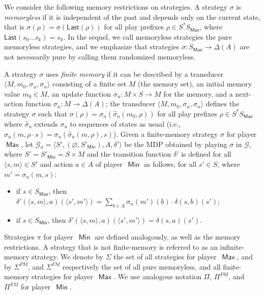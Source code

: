 \documentclass{article}
\newcommand{\tuple}[1]{\langle #1 \rangle}
\let\emptyset\varnothing
\newcommand{\Last}{\mathsf{Last}}
\newcommand{\DD}{\Delta}
\newcommand{\GG}{\mathcal{G}}
\newcommand{\PP}{\delta}
\newcommand{\straa}{\sigma}
\newcommand{\Straa}{\Sigma}
\newcommand{\strab}{\pi}
\newcommand{\Strab}{\Pi}
\DeclareMathOperator{\ma}{\mathsf{Max}}
\DeclareMathOperator{\mi}{\mathsf{Min}}
\begin{document}
We consider the following memory restrictions on strategies.
A strategy $\straa$ is \emph{memoryless} if it is independent of the past and depends only on 
the current state, that is $\straa(\rho) = \straa(\Last(\rho))$ for all play prefixes 
$\rho \in S^*S_{\ma}$, where $\Last(s_0 \dots s_k) = s_k$.
In the sequel, we call memoryless strategies the pure memoryless strategies,
and we emphasize that strategies $\straa: S_{\ma} \to \DD(A)$ are not necessarily 
pure by calling them randomized memoryless.


A strategy $\straa$ uses \emph{finite memory} if it can be described 
by a transducer $\tuple{M, m_0, \straa_u, \straa_n}$ consisting of a finite
set $M$ (the memory set), an initial memory value $m_0 \in M$, 
an update function $\straa_u: M \times S \to M$ for the memory, 
and a next-action function $\straa_n: M \to \DD(A)$; the transducer $\tuple{M, m_0, \straa_u, \straa_n}$ 
defines the strategy $\straa$ such that $\straa(\rho) = \straa_n(\hat{\straa}_u(m_0,\rho))$ 
for all play prefixes $\rho \in S^*S_{\ma}$
where $\hat{\straa}_u$ extends $\straa_u$ to sequences of states as usual (i.e.,
$\hat{\straa}_u(m, \rho \cdot s) = \straa_u(\hat{\straa}_u(m, \rho), s)$).
Given a finite-memory strategy $\straa$ for player~$\ma$, let $\GG_\straa = \tuple{S', (\emptyset, S'_{\mi}), A, \PP'}$ 
be the MDP obtained by playing $\straa$ in $\GG$, where 
$S' = S'_{\mi} = S \times M$    and the transition function $\PP'$ is defined
for all $\tuple{s,m} \in S'$ and action $a \in A$ of player~$\mi$ as follows,
for all $s'\in S$, where $m' = \straa_u(m,s)$:
\begin{itemize}
\item if $s \in S_{\ma}$, then 
$\PP'(\tuple{s,m}, a)(\tuple{s',m'}) = \sum_{b \in A} \straa_n(m')(b) \cdot \PP(s,b)(s')$; 
\item if $s \in S_{\mi}$, then 
$\PP'(\tuple{s,m}, a)(\tuple{s',m'}) = \PP(s,a)(s')$.
\end{itemize}


Strategies $\strab$ for player~$\mi$ are defined analogously, as well as the memory restrictions.
A strategy that is not finite-memory is referred to as an infinite-memory 
strategy. We denote by $\Straa$ the set of all strategies for player~$\ma$, 
and by $\Straa^{PM}$, 
and $\Straa^{FM}$ respectively the set of all pure memoryless,
and all finite-memory strategies 
for player~$\ma$. We use analogous notation $\Strab$, $\Strab^{PM}$, and $\Strab^{FM}$ for player~$\mi$.
\end{document}
